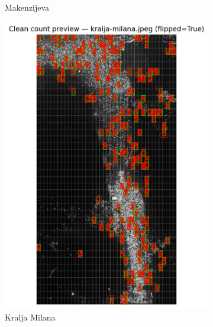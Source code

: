 \documentclass[a4paper,12pt]{article}
\begin{document}
\begin{figure}[H]
\begin{subfigure}[b]{0.3\textwidth}
	  \caption{Makenzijeva}
	  \label{fig:makenzijeva}
	\end{subfigure}
	\hfill
	\begin{subfigure}[b]{0.3\textwidth}
	  \centering
	  \includegraphics[width=\textwidth]{../outputs/sampling_outputs/previews_images_main/kralja-milana_pilot_clean_count_preview.png}
	  \caption{Kralja Milana}
	  \label{fig:kralja-milana}
	\end{subfigure}
	\hfill
	\begin{subfigure}[b]{0.3\textwidth}
	  \centering

\end{subfigure}
\end{figure}
\end{document}
